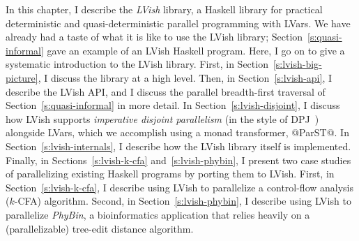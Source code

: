 In this chapter, I describe the \emph{LVish} library, a Haskell
library for practical deterministic and quasi-deterministic parallel
programming with LVars.  We have already had a taste of what it is
like to use the LVish library; Section~\ref{s:quasi-informal} gave an
example of an LVish Haskell program.  Here, I go on to give a
systematic introduction to the LVish library.  First, in
Section~\ref{s:lvish-big-picture}, I discuss the library at a high
level.  Then, in Section~\ref{s:lvish-api}, I describe the LVish API,
and I discuss the parallel breadth-first traversal of
Section~\ref{s:quasi-informal} in more detail.  In
Section~\ref{s:lvish-disjoint}, I discuss how LVish
supports \emph{imperative disjoint parallelism} (in the style of
DPJ~\cite{dpj-oopsla}) alongside LVars, which we accomplish using a
monad transformer, @ParST@.  In Section~\ref{s:lvish-internals}, I
describe how the LVish library itself is implemented.  Finally, in
Sections~\ref{s:lvish-k-cfa} and~\ref{s:lvish-phybin}, I present two
case studies of parallelizing existing Haskell programs by porting
them to LVish.  First, in Section~\ref{s:lvish-k-cfa}, I describe
using LVish to parallelize a control-flow analysis ($k$-CFA)
algorithm.  Second, in Section~\ref{s:lvish-phybin}, I describe using
LVish to parallelize
\emph{PhyBin}, a bioinformatics application that relies heavily on a
(parallelizable) tree-edit distance algorithm.
